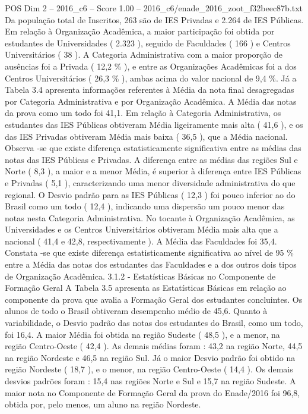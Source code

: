 \begin{textsample}{POS Dim 2 – 2016\_c6 – Score 1.00 – 2016\_c6/enade\_2016\_zoot\_f32beec87b.txt}
Da população total de Inscritos, 263 são de IES Privadas e 2.264 de IES Públicas.
Em relação à Organização Acadêmica, a maior participação foi obtida por estudantes de Universidades ( 2.323 ), seguido de Faculdades ( 166 ) e Centros Universitários ( 38 ).
A Categoria Administrativa com a maior proporção de ausências foi a Privada ( 12,2 \% ), e entre as Organizações Acadêmicas foi a dos Centros Universitários ( 26,3 \% ), ambas acima do valor nacional de 9,4 \%.
Já a Tabela 3.4 apresenta informações referentes à Média da nota final desagregadas por Categoria Administrativa e por Organização Acadêmica.
A Média das notas da prova como um todo foi 41,1.
Em relação à Categoria Administrativa, os estudantes das IES Públicas obtiveram Média ligeiramente mais alta ( 41,6 ), e os das IES Privadas obtiveram Média mais baixa ( 36,5 ), que a Média nacional.
Observa -se que existe diferença estatisticamente significativa entre as médias das notas das IES Públicas e Privadas.
A diferença entre as médias das regiões Sul e Norte ( 8,3 ), a maior e a menor Média, é superior à diferença entre IES Públicas e Privadas ( 5,1 ), caracterizando uma menor diversidade administrativa do que regional.
O Desvio padrão para as IES Públicas ( 12,3 ) foi pouco inferior ao do Brasil como um todo ( 12,4 ), indicando uma dispersão um pouco menor das notas nesta Categoria Administrativa.
No tocante à Organização Acadêmica, as Universidades e os Centros Universitários obtiveram Média mais alta que a nacional ( 41,4 e 42,8, respectivamente ).
A Média das Faculdades foi 35,4.
Constata -se que existe diferença estatisticamente significativa ao nível de 95 \% entre a Média das notas dos estudantes das Faculdades e a dos outros dois tipos de Organização Acadêmica. 3.1.2 - Estatísticas Básicas no Componente de Formação Geral A Tabela 3.5 apresenta as Estatísticas Básicas em relação ao componente da prova que avalia a Formação Geral dos estudantes concluintes.
Os alunos de todo o Brasil obtiveram desempenho médio de 45,6.
Quanto à variabilidade, o Desvio padrão das notas dos estudantes do Brasil, como um todo, foi 16,4.
A maior Média foi obtida na região Sudeste ( 48,5 ), e a menor, na região Centro-Oeste ( 42,4 ).
As demais médias foram : 43,2 na região Norte, 44,5 na região Nordeste e 46,5 na região Sul.
Já o maior Desvio padrão foi obtido na região Nordeste ( 18,7 ), e o menor, na região Centro-Oeste ( 14,4 ).
Os demais desvios padrões foram : 15,4 nas regiões Norte e Sul e 15,7 na região Sudeste.
A maior nota no Componente de Formação Geral da prova do Enade/2016 foi 96,8, obtida por, pelo menos, um aluno na região Nordeste.

\end{textsample}
